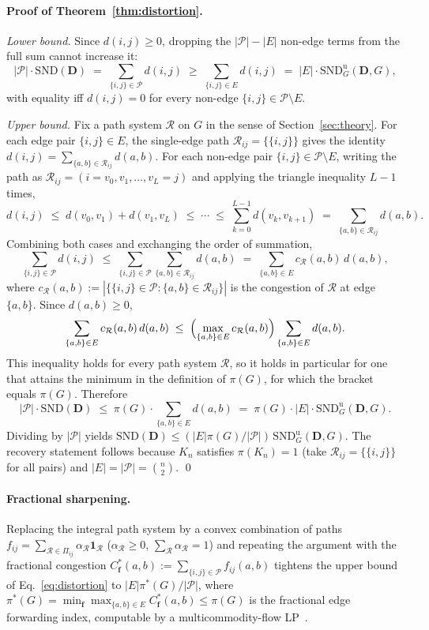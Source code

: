 \documentclass{article}
\theoremstyle{plain}
\theoremstyle{definition}
\theoremstyle{remark}
\newcommand{\Pairs}{\mathcal{P}}         %
\newcommand{\SND}{\ensuremath{\mathrm{SND}}}
\newcommand{\SNDG}{\mathrm{SND}_{G}}
\begin{document}
\paragraph{Proof of Theorem~\ref{thm:distortion}.}

\emph{Lower bound.} Since $d(i,j) \geq 0$, dropping the
$|\Pairs|-|E|$ non-edge terms from the full sum cannot increase it:
\[
|\Pairs|\cdot\SND(\mathbf{D})
\;=\; \sum_{\{i,j\}\in\Pairs} d(i,j)
\;\geq\; \sum_{\{i,j\}\in E} d(i,j)
\;=\; |E|\cdot\SNDG^{\mathrm{u}}(\mathbf{D},G),
\]
with equality iff $d(i,j)=0$ for every non-edge
$\{i,j\}\in\Pairs\setminus E$.

\emph{Upper bound.} Fix a path system $\mathcal{R}$ on $G$ in the sense
of Section~\ref{sec:theory}. For each edge pair $\{i,j\}\in E$, the
single-edge path $\mathcal{R}_{ij}=\{\{i,j\}\}$ gives the identity
$d(i,j)=\sum_{\{a,b\}\in\mathcal{R}_{ij}} d(a,b)$. For each non-edge
pair $\{i,j\}\in\Pairs\setminus E$, writing the path as
$\mathcal{R}_{ij}=(i=v_0,v_1,\dots,v_L=j)$ and applying the triangle
inequality $L-1$ times,
\[
d(i,j)\;\leq\; d(v_0,v_1)+d(v_1,v_L)\;\leq\;\cdots\;\leq\;
\sum_{k=0}^{L-1} d(v_k,v_{k+1})
\;=\; \sum_{\{a,b\}\in\mathcal{R}_{ij}} d(a,b).
\]
Combining both cases and exchanging the order of summation,
\[
\sum_{\{i,j\}\in\Pairs} d(i,j)
\;\leq\; \sum_{\{i,j\}\in\Pairs}\sum_{\{a,b\}\in\mathcal{R}_{ij}} d(a,b)
\;=\; \sum_{\{a,b\}\in E} c_{\mathcal{R}}(a,b)\,d(a,b),
\]
where
$c_{\mathcal{R}}(a,b):=|\{\{i,j\}\in\Pairs : \{a,b\}\in\mathcal{R}_{ij}\}|$
is the congestion of $\mathcal{R}$ at edge $\{a,b\}$. Since $d(a,b)\geq 0$,
\[
\sum_{\{a,b\}\in E} c_{\mathcal{R}}(a,b)\,d(a,b)
\;\leq\; \Bigl(\max_{\{a,b\}\in E} c_{\mathcal{R}}(a,b)\Bigr)
\sum_{\{a,b\}\in E} d(a,b).
\]
This inequality holds for every path system $\mathcal{R}$, so it holds
in particular for one that attains the minimum in the definition of
$\pi(G)$, for which the bracket equals $\pi(G)$. Therefore
\[
|\Pairs|\cdot\SND(\mathbf{D})
\;\leq\; \pi(G)\cdot\sum_{\{a,b\}\in E} d(a,b)
\;=\; \pi(G)\cdot |E|\cdot\SNDG^{\mathrm{u}}(\mathbf{D}, G).
\]
Dividing by $|\Pairs|$ yields
$\SND(\mathbf{D})\leq (|E|\pi(G)/|\Pairs|)\,\SNDG^{\mathrm{u}}(\mathbf{D},G)$.
The recovery statement follows because $K_n$ satisfies $\pi(K_n)=1$
(take $\mathcal{R}_{ij}=\{\{i,j\}\}$ for all pairs) and
$|E|=|\Pairs|=\binom{n}{2}$. \qed

\paragraph{Fractional sharpening.}
Replacing the integral path system by a convex combination of paths
$f_{ij}=\sum_{\mathcal{R}\in\Pi_{ij}}\alpha_{\mathcal{R}}\mathbf{1}_{\mathcal{R}}$
($\alpha_{\mathcal{R}}\geq 0$, $\sum_{\mathcal{R}}\alpha_{\mathcal{R}}=1$)
and repeating the argument with the fractional congestion
$C^{*}_{\mathbf{f}}(a,b):=\sum_{\{i,j\}\in\Pairs} f_{ij}(a,b)$ tightens
the upper bound of Eq.~\eqref{eq:distortion} to
$|E|\pi^{*}(G)/|\Pairs|$, where
$\pi^{*}(G)=\min_{\mathbf{f}}\max_{\{a,b\}\in E} C^{*}_{\mathbf{f}}(a,b)\leq\pi(G)$
is the fractional edge forwarding index, computable by a
multicommodity-flow LP~\citep{leighton1999multicommodity}.
\end{document}

